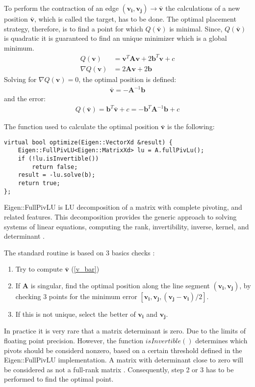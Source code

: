 To perform the contraction of an edge $(\mathbf{v_i}, \mathbf{v_j})\rightarrow\bar{\mathbf{v}}$ the calculations of a new position $\mathbf{\bar{v}}$, which is called the target, has to be done. The optimal placement strategy, therefore, is to find a point for which $Q(\mathbf{\bar{v}})$ is minimal. Since, $Q(\mathbf{\bar{v}})$ is quadratic it is guaranteed to find an unique minimizer which is a global minimum.
\begin{align}
Q(\mathbf{v}) &= \mathbf{v}^T\mathbf{A}\mathbf{v} + 2\mathbf{b}^T\mathbf{v} + c\\
\nabla Q(\mathbf{v}) &= 2\mathbf{A}\mathbf{v} + 2 \mathbf{b}
\end{align}
Solving for $\nabla Q(\mathbf{v}) = 0$, the optimal position is defined:
\begin{align}
\mathbf{\bar{v}} = -\mathbf{A}^{-1}\mathbf{b}
\label{v_bar}
\end{align}
and the error:
\begin{align}
Q(\mathbf{\bar{v}}) = \mathbf{b}^T\mathbf{\bar{v}} + c = -\mathbf{b}^T\mathbf{A}^{-1}\mathbf{b} + c
\end{align}

The function used to calculate the optimal position $\mathbf{\bar{v}}$ is the following:
\begin{center}
\begin{lstlisting}[caption={LU decomposition for solving a linear system.},captionpos=b]
virtual bool optimize(Eigen::VectorXd &result) {
	Eigen::FullPivLU<Eigen::MatrixXd> lu = A.fullPivLu();
	if (!lu.isInvertible())
		return false;
	result = -lu.solve(b);
	return true;
};
\end{lstlisting}
\end{center}
Eigen::FullPivLU is LU decomposition of a matrix with complete pivoting, and related features. This decomposition provides the generic approach to solving systems of linear equations, computing the rank, invertibility, inverse, kernel, and determinant \cite{eigenLU19}.

The standard routine is based on 3 basics checks \cite{garland99}:
\begin{enumerate}
\item Try to compute $\mathbf{\bar{v}}$ (\ref{v_bar})
\item If $\mathbf{A}$ is singular, find the optimal position along the line segment $(\mathbf{v_i}, \mathbf{v_j})$, by checking 3 points for the minimum error $[\mathbf{v_i}, \mathbf{v_j}, (\mathbf{v_j} - \mathbf{v_i}) / 2]$.
\item If this is not unique, select the better of $\mathbf{v_i}$ and $ \mathbf{v_j}$.
\end{enumerate}
In practice it is very rare that a matrix determinant is zero. Due to the limits of floating point precision. However, the function $isInvertible()$ determines which pivots should be considerd nonzero, based on a certain threshold defined in the Eigen::FullPivLU implementation. A matrix with determinant close to zero will be considered as not a full-rank matrix \cite{strang88}. Consequently, step 2 or 3 has to be performed to find the optimal point.

